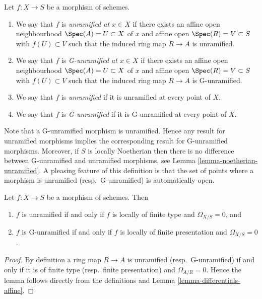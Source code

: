 \begin{definition}
\label{definition-unramified}
Let $f : X \to S$ be a morphism of schemes.
\begin{enumerate}
\item We say that $f$ is {\it unramified at $x \in X$} if
there exists an affine open neighbourhood $\Spec(A) = U \subset X$
of $x$ and affine open $\Spec(R) = V \subset S$
with $f(U) \subset V$ such that the induced ring map
$R \to A$ is unramified.
\item We say that $f$ is {\it G-unramified at $x \in X$} if
there exists an affine open neighbourhood $\Spec(A) = U \subset X$
of $x$ and affine open $\Spec(R) = V \subset S$
with $f(U) \subset V$ such that the induced ring map
$R \to A$ is G-unramified.
\item We say that $f$ is {\it unramified} if it is unramified
at every point of $X$.
\item We say that $f$ is {\it G-unramified} if it is G-unramified
at every point of $X$.
\end{enumerate}
\end{definition}

\noindent
Note that a G-unramified morphism is unramified. Hence any result for
unramified morphisms implies the corresponding result for G-unramified
morphisms. Moreover, if $S$ is locally Noetherian then there is no difference
between G-unramified and unramified morphisms, see
Lemma \ref{lemma-noetherian-unramified}.
A pleasing feature of this definition is that the set of points
where a morphism is unramified (resp.\ G-unramified) is automatically open.

\begin{lemma}
\label{lemma-unramified-omega-zero}
Let $f : X \to S$ be a morphism of schemes. Then
\begin{enumerate}
\item $f$ is unramified if and only if $f$ is locally of finite type
and $\Omega_{X/S} = 0$, and
\item $f$ is G-unramified if and only if $f$ is locally of finite presentation
and $\Omega_{X/S} = 0$.
\end{enumerate}
\end{lemma}

\begin{proof}
By definition a ring map $R \to A$ is unramified (resp.\ G-unramified)
if and only if it is of finite type (resp.\ finite presentation)
and $\Omega_{A/R} = 0$. Hence the lemma follows
directly from the definitions and Lemma \ref{lemma-differentials-affine}.
\end{proof}

